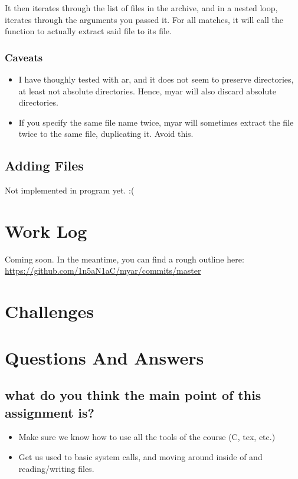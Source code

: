 \documentclass[letterpaper,10pt,titlepage]{article}
\begin{document}
It then iterates through the list of files in the archive, and in a nested loop, iterates through the arguments you passed it.  For all matches, it will call the function to actually extract said file to its file.

\subsubsection{Caveats}

\begin{itemize}
\item I have thoughly tested with ar, and it does not seem to preserve directories, at least not absolute directories.  Hence, myar will also discard absolute directories.
\item If you specify the same file name twice, myar will sometimes extract the file twice to the same file, duplicating it.  Avoid this.
\end{itemize}

\subsection{Adding Files}

Not implemented in program yet.  :(

\section{Work Log}

Coming soon.  In the meantime, you can find a rough outline here:
\url{https://github.com/1n5aN1aC/myar/commits/master}

\section{Challenges}

\section{Questions And Answers}

\subsection{what do you think the main point of this assignment is?}

\begin{itemize}
\item Make sure we know how to use all the tools of the course (C, tex, etc.)
\item Get us used to basic system calls, and moving around inside of and reading/writing files.
\end{itemize}
\end{document}
